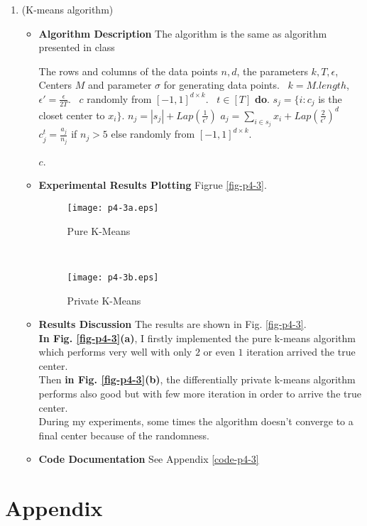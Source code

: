 \documentclass[11pt]{article}
\begin{document}
\begin{enumerate}
\begin{proof}
\end{proof}
%
%
\item (K-means algorithm)
\begin{itemize}
\item \textbf{Algorithm Description}
%
The algorithm is the same as algorithm presented in class
%
\begin{algorithm}
\caption{Differentially Private K-means}
\label{alg_p4-3}
\begin{algorithmic}
\REQUIRE The rows and columns of the data points $n, d$, the parameters $k, T, \epsilon$, Centers $M$ and parameter $\sigma$ for generating data points.
\ $k = M.length$, $\epsilon' = \frac{\epsilon}{2T}$.  
\ $c$ randomly from $[-1, 1]^{d \times k}$. 
\ $t \in [T]$  {\bf do}.
\STATE \qquad	$s_j = \{i : c_j$ is the closet center to $x_i \}$.
\STATE \qquad	$n_j = |s_j| + Lap(\frac{1}{\epsilon'})$ 
\STATE \qquad	$a_j = \sum_{i \in s_j}x_i
			+ Lap(\frac{2}{\epsilon'})^d$ 
\STATE \qquad	$c_j^t = \frac{a_j}{n_j}$ if $n_j > 5$ else randomly from $[-1, 1]^{d \times k}$.
		
\RETURN $c$.
\end{algorithmic}
\end{algorithm}

%
\item \textbf{Experimental Results Plotting}
%
Figrue \ref{fig-p4-3}.
		\begin{figure*}[t!]
		    \centering
		    \begin{subfigure}[t]{0.5\textwidth}
		        \centering
		        \texttt{[image: p4-3a.eps]}
		        \caption{Pure K-Means}
		    \end{subfigure}%
		    ~ 
		    \begin{subfigure}[t]{0.5\textwidth}
		        \centering
		        \texttt{[image: p4-3b.eps]}
		        \caption{Private K-Means}
		    \end{subfigure}
		    \caption{P4: K-Means Algorithms}
		    \label{fig-p4-3}
		\end{figure*}
%
\item \textbf{Results Discussion}
%
The results are shown in Fig. \ref{fig-p4-3}. 
%
\\
%
\textbf{In Fig. \ref{fig-p4-3}(a)}, I firstly implemented the pure k-means algorithm which performs very well with only $2$ or even $1$ iteration arrived the true center.
%
\\
%
Then \textbf{in Fig. \ref{fig-p4-3}(b)}, the differentially private k-means algorithm performs also good but with few more iteration in order to arrive the true center.
%
\\
%
During my experiments, some times the algorithm doesn't converge to a final center because of the randomness. 

\item \textbf{Code Documentation}
See Appendix \ref{code-p4-3}
%

\end{itemize}

\end{enumerate}

\section*{Appendix}

\end{document}
